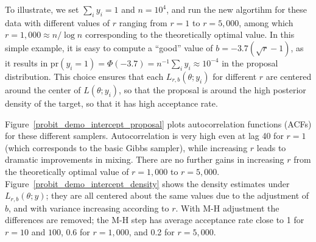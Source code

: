 \documentclass[10pt]{article}
\begin{document}
To illustrate, we set $\sum_i y_i =1$ and $n=10^4$, and run the new algortihm for these data with different values of $r$ ranging from $r=1$ to $r=5,000$, among which $r=1,000 \approx n/\log n$ corresponding to the theoretically optimal value. In this simple example, it is easy to compute a ``good'' value of $b = -3.7 (\sqrt r -1)$, as it results in $\mbox{pr}(y_i = 1) = \Phi(-3.7) = n^{-1}\sum_i y_i  \approx 10^{-4}$ in the proposal distribution. This choice ensures that each $L_{r,b}(\theta;y_i) $ for different $r$ are centered around the center of $L(\theta;y_i)$, so that the proposal is around the high posterior density of the target, so that it has high acceptance rate.

Figure~\ref{probit_demo_intercept_proposal} plots autocorrelation functions (ACFs) for these different samplers. Autocorrelation is very high even at lag 40 for $r=1$ (which corresponds to the basic Gibbs sampler), while increasing $r$ leads to dramatic improvements in mixing. There are no further gains in increasing $r$ from the theoretically optimal value of $r=1,000$ to $r=5,000$. Figure~\ref{probit_demo_intercept_density} shows the density estimates under $L_{r,b}(\theta;y)$; they are all centered about the same values due to the adjustment of $b$, and with variance increasing according to $r$.  With M-H adjustment the differences are removed; the M-H step has average acceptance rate close to 1 for $r=10$ and $100$, 0.6 for $r=1,000$, and 0.2 for $r=5,000$.
\end{document}
